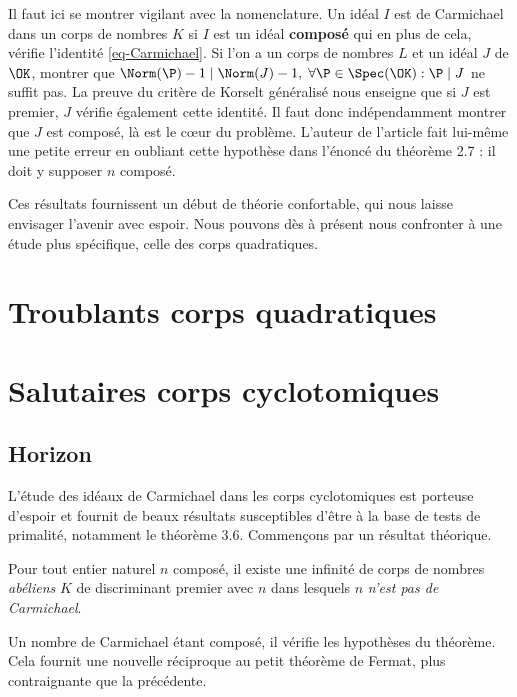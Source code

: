 \documentclass[a4paper, 12pt, oneside]{article}
\begin{document}
\begin{remarque}
	Il faut ici se montrer vigilant avec la nomenclature. Un idéal $I$ est de Carmichael dans un corps de nombres $K$ si $I$ est un idéal \textbf{composé} qui en plus de cela, vérifie l'identité \ref{eq-Carmichael}. Si l'on a un corps de nombres $L$ et un idéal $J$ de $\OK$, montrer que $\Norm(\P) - 1\mid \Norm(J) - 1,\; \forall \P\in \Spec(\OK) : \P\mid J$ ne suffit pas. La preuve du critère de Korselt généralisé nous enseigne que si $J$ est premier, $J$ vérifie également cette identité. Il faut donc indépendamment montrer que $J$ est composé, là est le cœur du problème. L'auteur de l'article fait lui-même une petite erreur en oubliant cette hypothèse dans l'énoncé du théorème 2.7 : il doit y supposer $n$ composé.
\end{remarque}

Ces résultats fournissent un début de théorie confortable, qui nous laisse envisager l'avenir avec espoir. Nous pouvons dès à présent nous confronter à une étude plus spécifique, celle des corps quadratiques.

\section{Troublants corps quadratiques}

\section{Salutaires corps cyclotomiques}

\subsection{Horizon}

L'étude des idéaux de Carmichael dans les corps cyclotomiques est porteuse d'espoir et fournit de beaux résultats susceptibles d'être à la base de tests de primalité, notamment le théorème 3.6. Commençons par un résultat théorique.

\begin{theoreme}
	Pour tout entier naturel $n$ composé, il existe une infinité de corps de nombres \emph{abéliens} $K$ de discriminant premier avec $n$ dans lesquels $n$ \emph{n'est pas de Carmichael}.
\end{theoreme}

Un nombre de Carmichael étant composé, il vérifie les hypothèses du théorème. Cela fournit une nouvelle réciproque au petit théorème de Fermat, plus contraignante que la précédente.
\end{document}
